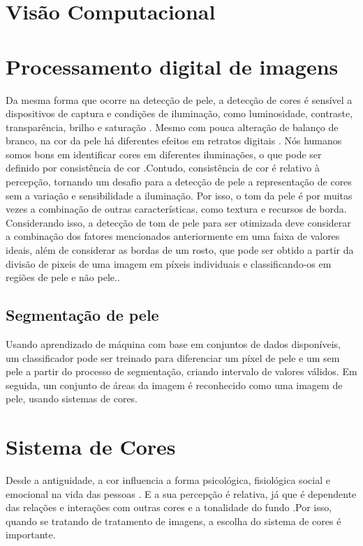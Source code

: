 \section{Visão Computacional}

\section{Processamento digital de imagens}
Da mesma forma que ocorre na detecção de pele, a detecção de cores é sensível a dispositivos de captura e condições de iluminação, como luminosidade, contraste, transparência, brilho e saturação \cite{Human_Skin_Detection_Using_RGB_HSV_and_YCbCr_Color_Models}. Mesmo com pouca alteração de balanço de branco, na cor da pele há diferentes efeitos  em retratos digitais \cite{Skin_Color_Perception_in_Portrait_Image_and_AR_based_Humanoid_Emoji}. Nós humanos somos bons em identificar cores em diferentes iluminações, o que pode ser definido por consistência de cor \cite{Skin_detection_ashort_tutorial}.Contudo, consistência de cor é relativo à percepção, tornando um desafio para a detecção de pele a representação de cores sem a variação e sensibilidade a iluminação. Por isso, o tom da pele é por muitas vezes a combinação de outras características, como textura e recursos de borda. Considerando isso, a detecção de tom de pele para ser otimizada deve considerar a combinação dos fatores mencionados anteriormente em uma faixa de valores ideais, além de considerar as bordas de um rosto, que pode ser obtido a partir da divisão de pixeis de uma imagem em píxeis individuais e classificando-os em regiões de pele e não pele.\cite{Human_Skin_Detection_Using_RGB_HSV_and_YCbCr_Color_Models}.

\subsection{Segmentação de pele}
Usando aprendizado de máquina com base em conjuntos de dados disponíveis, um classificador pode ser treinado para diferenciar um píxel de pele e um sem pele a partir do processo de segmentação, criando  intervalo de valores válidos. Em seguida, um conjunto de áreas da imagem é reconhecido como uma imagem de pele, usando sistemas de cores.

\section{Sistema de Cores}
 Desde a antiguidade, a cor influencia a forma psicológica, fisiológica social e emocional na vida das pessoas \cite{Visagismo}. E a sua percepção é relativa, já que é dependente das relações e interações com outras cores e a tonalidade do fundo \cite{Visagismo}.Por isso, quando se tratando de tratamento de imagens, a escolha do sistema de cores é importante.

